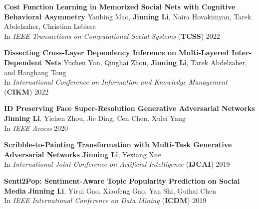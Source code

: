 \documentclass[12pt, letterpaper]{article}
\begin{document}
\textbf{Cost Function Learning in Memorized Social Nets with Cognitive Behavioral Asymmetry}
\href{https://ieeexplore.ieee.org/document/9945909}{}
\newline
\footnotesize
Yanbing Mao, \textbf{Jinning Li}, Naira Hovakimyan, Tarek Abdelzaher, Christian Lebiere\\
In \emph{IEEE Transactions on Computational Social Systems} (\textbf{TCSS}) 2022
\small
\vspace{2pt}

\textbf{Dissecting Cross-Layer Dependency Inference on Multi-Layered Inter-Dependent Nets}
\href{https://dl.acm.org/doi/abs/10.1145/3511808.3557291}{}
\newline
\footnotesize
Yuchen Yan, Qinghai Zhou, \textbf{Jinning Li}, Tarek Abdelzaher, and Hanghang Tong\\
In \emph{International Conference on Information and Knowledge Management} (\textbf{CIKM}) 2022
\small
\vspace{2pt}

\textbf{ID Preserving Face Super-Resolution Generative Adversarial Networks}
\href{https://ieeexplore.ieee.org/document/9146819}{}\href{https://github.com/jinningli/IP-FSRGAN}{}
\newline
\footnotesize
\textbf{Jinning Li}, Yichen Zhou, Jie Ding, Cen Chen, Xulei Yang\\
In \emph{IEEE Access} 2020
\small
\vspace{2pt}

\textbf{Scribble-to-Painting Transformation with Multi-Task Generative Adversarial Networks}
\href{https://www.ijcai.org/proceedings/2019/820}{}\href{https://github.com/jinningli/DSP-Net}{}
\newline
\footnotesize
\textbf{Jinning Li}, Yexiang Xue\\
In \emph{International Joint Conference on Artificial Intelligence} (\textbf{IJCAI}) 2019
\small
\vspace{2pt}

\textbf{Senti2Pop: Sentiment-Aware Topic Popularity Prediction on Social Media}
\href{http://jinningli.cn/cv/Senti2Pop.pdf}{}
\newline
\footnotesize
\textbf{Jinning Li}, Yirui Gao, Xiaofeng Gao, Yan Shi, Guihai Chen\\
In \emph{IEEE International Conference on Data Mining} (\textbf{ICDM}) 2019
\small
\vspace{2pt}
\end{document}
